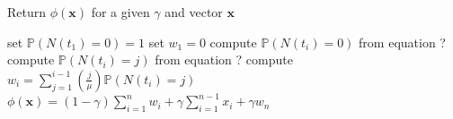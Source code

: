 \begin{algorithm}[htb]
\caption{Return $\phi (\mathbf{x})$ for a given $\gamma$ and vector $\mathbf{x}$}
\begin{algorithmic}
    \State set $\mathbb{P} \left( N (t_{1}) = 0 \right) = 1$
    \State set $w_{1} = 0$
    	\State compute $\mathbb{P} \left( N (t_{i}) = 0 \right)$ from equation ?
    		\State compute $\mathbb{P} \left( N (t_{i}) = j \right)$ from equation ?
    	\EndFor
    \EndFor
    	\State compute $w_{i} = \sum_{j = 1}^{i - 1} \left( \frac{j}{\mu} \right) \mathbb{P} \left( N (t_{i}) = j \right)$
    \EndFor
    \Return $\phi (\mathbf{x}) = (1 - \gamma) \sum_{i = 1}^{n} w_{i} + \gamma \sum_{i = 1}^{n - 1} x_{i} + \gamma w_{n}$
\EndFunction
\end{algorithmic}
\end{algorithm}







































